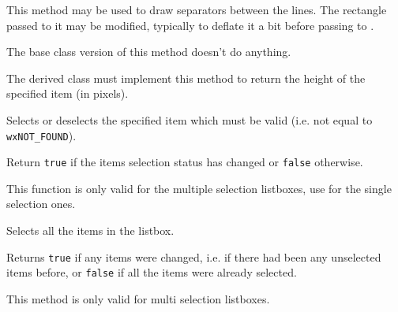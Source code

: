 

\label{wxvlistboxondrawseparator}


This method may be used to draw separators between the lines. The rectangle
passed to it may be modified, typically to deflate it a bit before passing to
.

The base class version of this method doesn't do anything.






\label{wxvlistboxonmeasureitem}


The derived class must implement this method to return the height of the
specified item (in pixels).


\label{wxvlistboxselect}


Selects or deselects the specified item which must be valid (i.e. not
equal to {\tt wxNOT\_FOUND}).

Return {\tt true} if the items selection status has changed or {\tt false}
otherwise.

This function is only valid for the multiple selection listboxes, use 
 for the single selection ones.


\label{wxvlistboxselectall}


Selects all the items in the listbox.

Returns {\tt true} if any items were changed, i.e. if there had been any
unselected items before, or {\tt false} if all the items were already selected.

This method is only valid for multi selection listboxes.


